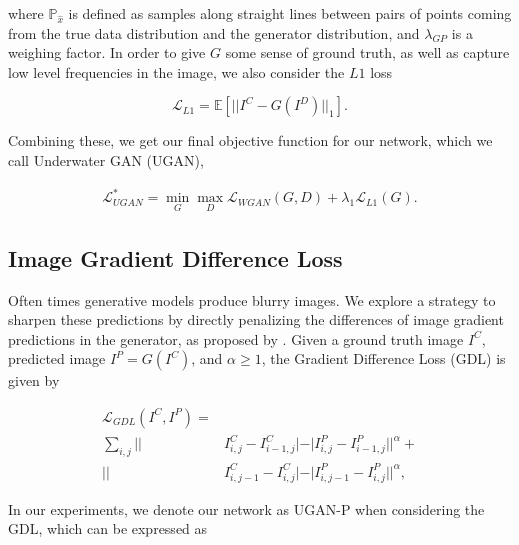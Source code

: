 \documentclass[conference,reqno]{IEEEtran}
\begin{document}
\noindent where $\mathbb{P}_{\hat{x}}$ is defined as samples along straight lines between pairs of points coming from
the true data distribution and the generator distribution, and $\lambda_{GP}$ is a weighing factor. In order to give $G$
some sense of ground truth, as well as capture low level frequencies in the image, we also consider the $L1$ loss

\begin{equation}
   \mathcal{L}_{L1} = \mathbb{E} [ || I^C - G(I^D) ||_1 ].
\end{equation}

\noindent Combining these, we get our final objective function for our network, which we call Underwater GAN (UGAN),

\begin{equation}
   \begin{aligned}
      \mathcal{L}_{UGAN}^* = \min\limits_{G}\max\limits_{D} \mathcal{L}_{WGAN}(G,D) + \lambda_{1} \mathcal{L}_{L1}(G).
   \end{aligned}
\end{equation}


\subsection{Image Gradient Difference Loss}
Often times generative models produce blurry images. We explore a strategy to sharpen these predictions by
directly penalizing the differences of image gradient predictions in the generator, as proposed by
\cite{mathieu2015deep}. Given a ground truth image $I^C$, predicted image $I^P = G(I^C)$, and $\alpha \geq 1$, the
Gradient Difference Loss (GDL) is given by

\begin{equation}
   \begin{aligned}
      \mathcal{L}_{GDL}(I^C, I^P) = \\ \sum\limits_{i,j} || & I^C_{i,j} - I^C_{i-1,j}| - | I^P_{i,j} - I^P_{i-1,j}||^{\alpha} + \\
      || & I^C_{i,j-1} - I^C_{i,j}| - | I^P_{i,j-1} - I^P_{i,j}||^{\alpha},
   \end{aligned}
\end{equation}

\noindent In our experiments, we denote our network as UGAN-P when considering the GDL, which can be expressed as
\end{document}
